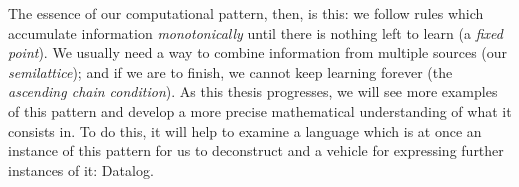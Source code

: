 \noindent
%
The essence of our computational pattern, then, is this: we follow rules which accumulate information \emph{monotonically} until there is nothing left to learn (a \emph{fixed point}). We usually need a way to combine information from multiple sources (our \emph{semilattice}); and if we are to finish, we cannot keep learning forever (the \emph{ascending chain condition}).
%
%
As this thesis progresses, we will see more examples of this pattern and develop a more precise mathematical understanding of what it consists in.
%
To do this, it will help to examine a language which is at once an instance of
this pattern for us to deconstruct and a vehicle for expressing further
instances of it: Datalog.







